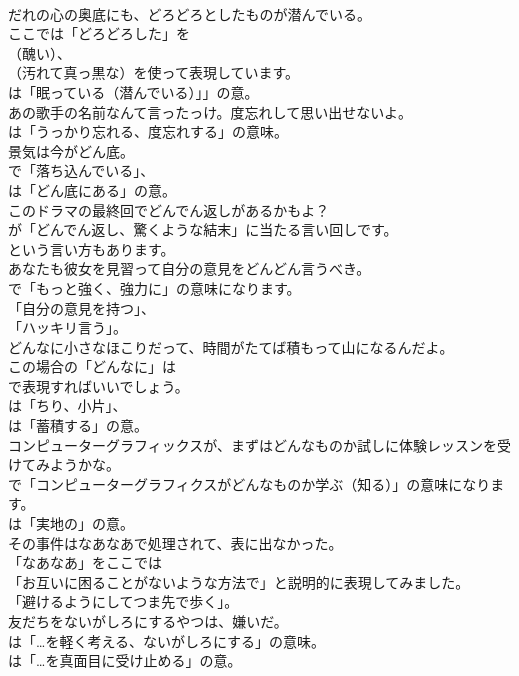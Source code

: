 \documentclass[8pt]{extreport}
\begin{document}
\begin{CJK}{UTF8}{min}
\\	だれの心の奥底にも、どろどろとしたものが潜んでいる。 
\\	ここでは「どろどろした」を
\\	（醜い）、
\\	（汚れて真っ黒な）を使って表現しています。
\\	は「眠っている（潜んでいる）」」の意。	
\\	あの歌手の名前なんて言ったっけ。度忘れして思い出せないよ。 
\\	は「うっかり忘れる、度忘れする」の意味。	
\\	景気は今がどん底。 
\\	で「落ち込んでいる」、
\\	は「どん底にある」の意。	
\\	このドラマの最終回でどんでん返しがあるかもよ？ 
\\	が「どんでん返し、驚くような結末」に当たる言い回しです。
\\	という言い方もあります。	
\\	あなたも彼女を見習って自分の意見をどんどん言うべき。 
\\	で「もっと強く、強力に」の意味になります。
\\	「自分の意見を持つ」、
\\	「ハッキリ言う」。	
\\	どんなに小さなほこりだって、時間がたてば積もって山になるんだよ。 
\\	この場合の「どんなに」は 
\\	で表現すればいいでしょう。
\\	は「ちり、小片」、
\\	は「蓄積する」の意。	
\\	コンピューターグラフィックスが、まずはどんなものか試しに体験レッスンを受けてみようかな。 
\\	で「コンピューターグラフィクスがどんなものか学ぶ（知る）」の意味になります。
\\	は「実地の」の意。	
\\	その事件はなあなあで処理されて、表に出なかった。 
\\	「なあなあ」をここでは
\\	「お互いに困ることがないような方法で」と説明的に表現してみました。
\\	「避けるようにしてつま先で歩く」。	
\\	友だちをないがしろにするやつは、嫌いだ。 
\\	は「…を軽く考える、ないがしろにする」の意味。
\\	は「…を真面目に受け止める」の意。	

\end{CJK}
\end{document}
